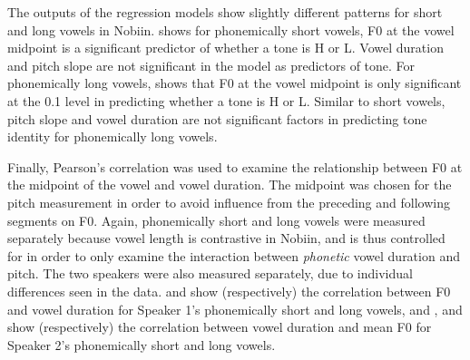 \documentclass[output=paper]{langscibook}
\begin{document}
The outputs of the regression models show slightly different patterns for short and long vowels in Nobiin.  shows for phonemically short vowels, F0 at the vowel midpoint is a significant predictor of whether a tone is H or L. Vowel duration and pitch slope are not significant in the model as predictors of tone. For phonemically long vowels,  shows that F0 at the vowel midpoint is only significant at the 0.1 level in predicting whether a tone is H or L. Similar to short vowels, pitch slope and vowel duration are not significant factors in predicting tone identity for phonemically long vowels.

Finally, Pearson's correlation was used to examine the relationship between F0 at the midpoint of the vowel and vowel duration. The midpoint was chosen for the pitch measurement in order to avoid influence from the preceding and following segments on F0. Again, phonemically short and long vowels were measured separately because vowel length is contrastive in Nobiin, and is thus controlled for in order to only examine the interaction between \textit{phonetic} vowel duration and pitch. The two speakers were also measured separately, due to individual differences seen in the data.  and  show (respectively) the correlation between F0 and vowel duration for Speaker 1's phonemically short and long vowels, and , and  show (respectively) the correlation between vowel duration and mean F0 for Speaker 2's phonemically short and long vowels.   
\end{document}
